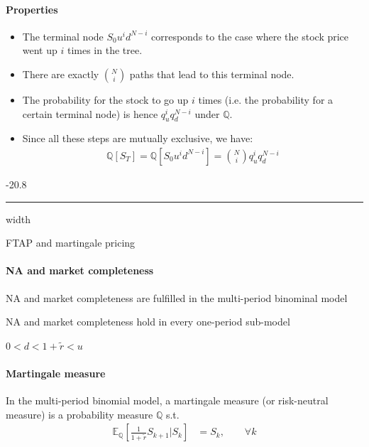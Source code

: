\documentclass[a4paper,landscape,7pt,fleqn]{scrartcl}
\makeatletter
\renewcommand{\subsubsection}{\@startsection{subsubsection}{1}{0mm}%
{-2\baselineskip}{0.8\baselineskip}%
{\hrule depth 0.2pt width\columnwidth\vspace*{1.2em}\normalsize\bfseries}}
\makeatother
\begin{document}
\begin{multicols*}{3}
\paragraph{Properties}
\begin{itemize}
\item The terminal node $S_0 u^i d^{N-i}$ corresponds to the case where the stock price went up $i$ times in the tree.
\item There are exactly $\binom{N}{i}$ paths that lead to this terminal node.
\item The probability for the stock to go up $i$ times (i.e. the probability for a certain terminal node) is hence $q_u^i q_d^{N-i}$ under $\mathbb{Q}$.
\item Since all these steps are mutually exclusive, we have:
\begin{align*}
\mathbb{Q}[S_T] = \mathbb{Q}[S_0 u^i d^{N-i}] = \binom{N}{i} q_u^i q_d^{N-i}
\end{align*}
\end{itemize}

\subsubsection{FTAP and martingale pricing}

\paragraph{NA and market completeness}
\begin{description}[style=multiline,leftmargin=0.7cm]
\item[] NA and market completeness are fulfilled in the multi-period binominal model
\item[$\iff$] NA and market completeness hold in every one-period sub-model
\item[$\iff$] $0 < d < 1 + \tilde r < u$
\end{description}

\paragraph{Martingale measure}
In the multi-period binomial model, a martingale measure (or risk-neutral measure) is a probability measure $\mathbb{Q}$ s.t.
\begin{align*}
\mathbb{E}_\mathbb{Q} \left[ \frac{1}{1 + \tilde r} S_{k+1} | S_k \right] &= S_k, \qquad \forall k
\end{align*}


\end{multicols*}
\end{document}
